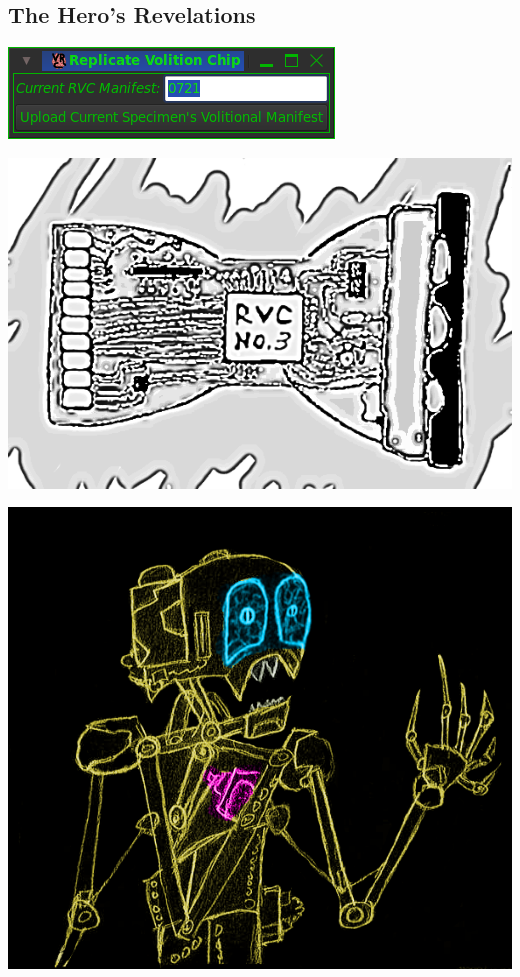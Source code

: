 \documentclass[12pt]{article}
\begin{document}
\begin{flushleft}

\section{The Hero's Revelations}

\noindent  \includegraphics[scale=0.5]{RVCWindow.png} \\
\newline

\noindent  \includegraphics[scale=0.75]{RVC_BAW.png} \\
\newline

\noindent  \includegraphics[scale=0.75]{Drone_InDark.png} \\



\end{flushleft}
\end{document}
